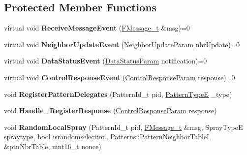 \subsection*{Protected Member Functions}
\begin{DoxyCompactItemize}
\item 
virtual void {\bfseries Receive\+Message\+Event} (\hyperlink{class_core_1_1_message_t}{F\+Message\+\_\+t} \&msg)=0\hypertarget{class_patterns_1_1_pattern_base_a8adcc760cd5b3396971fcdcd5cd80bd4}{}\label{class_patterns_1_1_pattern_base_a8adcc760cd5b3396971fcdcd5cd80bd4}

\item 
virtual void {\bfseries Neighbor\+Update\+Event} (\hyperlink{struct_core_1_1_neighbor_update_param}{Neighbor\+Update\+Param} nbr\+Update)=0\hypertarget{class_patterns_1_1_pattern_base_acf80253c9df2790d99835dfb8c3c4544}{}\label{class_patterns_1_1_pattern_base_acf80253c9df2790d99835dfb8c3c4544}

\item 
virtual void {\bfseries Data\+Status\+Event} (\hyperlink{struct_core_1_1_dataflow_1_1_data_status_param}{Data\+Status\+Param} notification)=0\hypertarget{class_patterns_1_1_pattern_base_ae56e132583d61c4ca6df0dbcd761da09}{}\label{class_patterns_1_1_pattern_base_ae56e132583d61c4ca6df0dbcd761da09}

\item 
virtual void {\bfseries Control\+Response\+Event} (\hyperlink{struct_p_w_i_1_1_control_response_param}{Control\+Response\+Param} response)=0\hypertarget{class_patterns_1_1_pattern_base_a06b77e9f4bd2d16bad7afa8832642850}{}\label{class_patterns_1_1_pattern_base_a06b77e9f4bd2d16bad7afa8832642850}

\item 
void {\bfseries Register\+Pattern\+Delegates} (Pattern\+Id\+\_\+t pid, \hyperlink{namespace_core_1_1_naming_ab40d44ea919ec3e3c8cc05576ba6d610}{Pattern\+TypeE} \+\_\+type)\hypertarget{class_patterns_1_1_pattern_base_a9e619e83f88c871e62b3cea084b12d1a}{}\label{class_patterns_1_1_pattern_base_a9e619e83f88c871e62b3cea084b12d1a}

\item 
void {\bfseries Handle\+\_\+\+Register\+Response} (\hyperlink{struct_p_w_i_1_1_control_response_param}{Control\+Response\+Param} response)\hypertarget{class_patterns_1_1_pattern_base_aa834f9cdbc178916878211a6177701fe}{}\label{class_patterns_1_1_pattern_base_aa834f9cdbc178916878211a6177701fe}

\item 
void {\bfseries Random\+Local\+Spray} (Pattern\+Id\+\_\+t pid, \hyperlink{class_core_1_1_message_t}{F\+Message\+\_\+t} \&msg, Spray\+TypeE spraytype, bool israndomselection, \hyperlink{class_patterns_1_1_pattern_neighbor_table_i}{Patterns\+::\+Pattern\+Neighbor\+TableI} \&ptn\+Nbr\+Table, uint16\+\_\+t nonce)\hypertarget{class_patterns_1_1_pattern_base_ae17eb4a43493158ff5f146482041ca90}{}\label{class_patterns_1_1_pattern_base_ae17eb4a43493158ff5f146482041ca90}


\end{DoxyCompactItemize}
